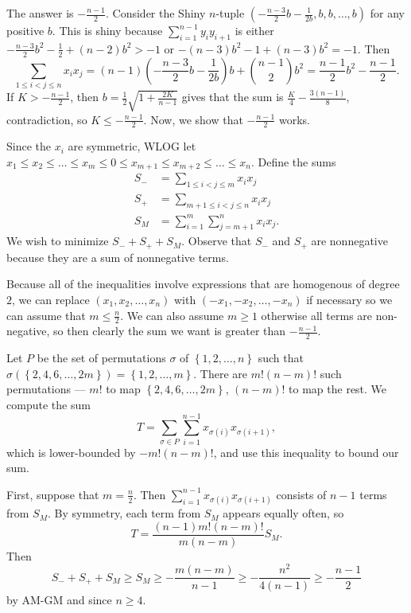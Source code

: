The answer is $\boxed{-\frac{n-1}{2}}$. Consider the Shiny $n$-tuple $\left(-\frac{n-3}{2}b-\frac{1}{2b},b,b,\ldots,b\right)$ for any positive $b$. This is shiny because $\displaystyle\sum_{i=1}^{n-1}y_iy_{i+1}$ is either $-\frac{n-3}{2}b^2-\frac{1}{2}+\left(n-2\right)b^2>-1$ or $-\left(n-3\right)b^2-1+\left(n-3\right)b^2=-1$. Then \[\displaystyle\sum_{1\leq i<j\leq n}x_ix_j=\left(n-1\right)\left(-\frac{n-3}{2}b-\frac{1}{2b}\right)b+\binom{n-1}{2}b^2=\frac{n-1}{2}b^2-\frac{n-1}{2}.\] If $K>-\frac{n-1}{2}$, then $b=\frac{1}{2}\sqrt{1+\frac{2K}{n-1}}$ gives that the sum is $\frac{K}{4}-\frac{3\left(n-1\right)}{8}$, contradiction, so $K\leq-\frac{n-1}{2}$. Now, we show that $-\frac{n-1}{2}$ works.

Since the $x_i$ are symmetric, WLOG let $x_1\leq x_2\leq\ldots\leq x_m\leq0\leq x_{m+1}\leq x_{m+2}\leq\ldots\leq x_n$. Define the sums
\begin{align*}
	S_-&=\displaystyle\sum_{1\leq i<j\leq m}x_ix_j\\
	S_+&=\displaystyle\sum_{m+1\leq i<j\leq n}x_ix_j\\
	S_M&=\displaystyle\sum_{i=1}^m\displaystyle\sum_{j=m+1}^nx_ix_j.
\end{align*}
We wish to minimize $S_-+S_++S_M$. Observe that $S_-$ and $S_+$ are nonnegative because they are a sum of nonnegative terms.

Because all of the inequalities involve expressions that are homogenous of degree $2$, we can replace $\left(x_1,x_2,\ldots,x_n\right)$ with $\left(-x_1,-x_2,\ldots,-x_n\right)$ if necessary so we can assume that $m\leq\frac{n}{2}$. We can also assume $m\geq1$ otherwise all terms are non-negative, so then clearly the sum we want is greater than $-\frac{n-1}{2}$.

Let $P$ be the set of permutations $\sigma$ of $\left\{1,2,\ldots,n\right\}$ such that $\sigma\left(\left\{2,4,6,\ldots,2m\right\}\right)=\left\{1,2,\ldots,m\right\}$. There are $m!\left(n-m\right)!$ such permutations --- $m!$ to map $\left\{2,4,6,\ldots,2m\right\}$, $\left(n-m\right)!$ to map the rest. We compute the sum \[T=\displaystyle\sum_{\sigma\in P}\displaystyle\sum_{i=1}^{n-1}x_{\sigma\left(i\right)}x_{\sigma\left(i+1\right)},\] which is lower-bounded by $-m!\left(n-m\right)!$, and use this inequality to bound our sum.

First, suppose that $m=\frac{n}{2}$. Then $\displaystyle\sum_{i=1}^{n-1}x_{\sigma\left(i\right)}x_{\sigma\left(i+1\right)}$ consists of $n-1$ terms from $S_M$. By symmetry, each term from $S_M$ appears equally often, so \[T=\frac{\left(n-1\right)m!\left(n-m\right)!}{m\left(n-m\right)}S_M.\] Then \[S_-+S_++S_M\geq S_M\geq-\frac{m\left(n-m\right)}{n-1}\geq-\frac{n^2}{4\left(n-1\right)}\geq-\frac{n-1}{2}\] by AM-GM and since $n\geq4$.

